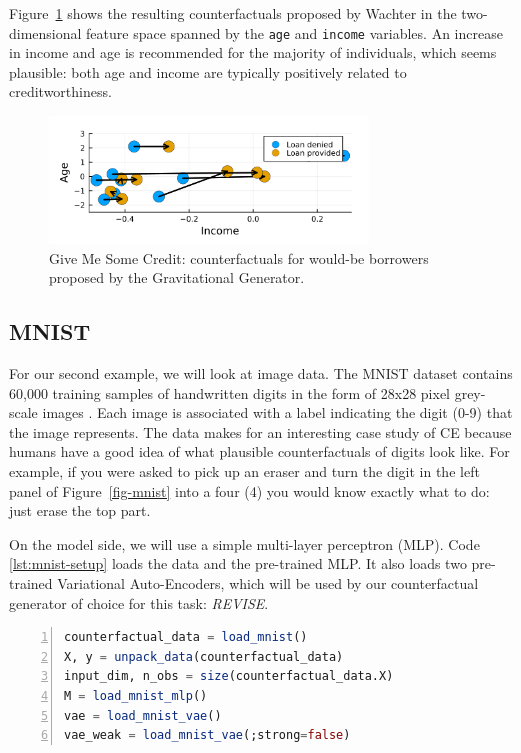 \documentclass{juliacon}
\begin{document}
Figure~\ref{fig-credit} shows the resulting counterfactuals proposed by
Wachter in the two-dimensional feature space spanned by the \texttt{age}
and \texttt{income} variables. An increase in income and age is
recommended for the majority of individuals, which seems plausible: both
age and income are typically positively related to creditworthiness.

\begin{figure}

{\centering \includegraphics[width=3.33333in,height=1.33333in]{www/credit.png}

}

\caption{\label{fig-credit}Give Me Some Credit: counterfactuals for
would-be borrowers proposed by the Gravitational Generator.}

\end{figure}

\hypertarget{mnist}{%
\subsection{MNIST}\label{mnist}}

For our second example, we will look at image data. The MNIST dataset
contains 60,000 training samples of handwritten digits in the form of
28x28 pixel grey-scale images \autocite{lecun1998mnist}. Each image is
associated with a label indicating the digit (0-9) that the image
represents. The data makes for an interesting case study of CE because
humans have a good idea of what plausible counterfactuals of digits look
like. For example, if you were asked to pick up an eraser and turn the
digit in the left panel of Figure~\ref{fig-mnist} into a four (4) you
would know exactly what to do: just erase the top part.

On the model side, we will use a simple multi-layer perceptron (MLP).
Code \ref{lst:mnist-setup} loads the data and the pre-trained MLP. It
also loads two pre-trained Variational Auto-Encoders, which will be used
by our counterfactual generator of choice for this task: \emph{REVISE}.

\begin{lstlisting}[language=Julia, escapechar=@, numbers=left, label={lst:mnist-setup}, caption={Loading pre-trained models and data for MNIST.}]
counterfactual_data = load_mnist()
X, y = unpack_data(counterfactual_data)
input_dim, n_obs = size(counterfactual_data.X)
M = load_mnist_mlp()
vae = load_mnist_vae()
vae_weak = load_mnist_vae(;strong=false)
\end{lstlisting}
\end{document}
